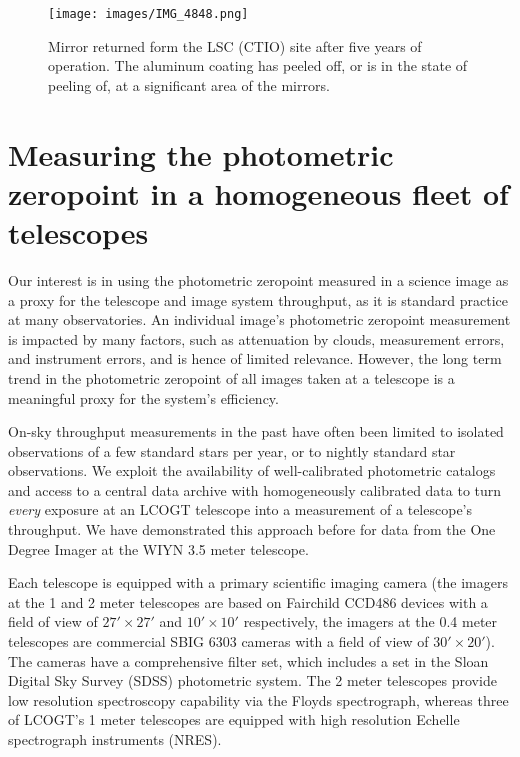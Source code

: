 \documentclass[]{spie}
\begin{document}
\begin{figure}
\texttt{[image: images/IMG\_4848.png]}
\caption{\label{fig_mirrorpeel} Mirror returned form the LSC (CTIO) site after five years of
operation. The aluminum coating has peeled off, or is in the state of peeling of, at a significant
area of the mirrors. }
\end{figure}


\section{Measuring the photometric zeropoint in a homogeneous fleet of telescopes}


Our interest is in using the photometric zeropoint measured in a science image as a proxy for the
telescope and image system throughput, as it is standard practice at many observatories. An
individual image's photometric zeropoint measurement is impacted by many factors, such as
attenuation by clouds, measurement errors, and instrument errors, and is hence of limited relevance.
However, the long term trend in the photometric zeropoint of all images taken at a telescope is a
meaningful proxy for the system's efficiency.

On-sky throughput measurements in the past have often been limited to isolated observations of a few
standard stars per year\cite{benn2000}, or to nightly standard star observations\cite{hopp2008}. We
exploit the availability of well-calibrated photometric catalogs and access to a central
data archive with homogeneously calibrated data to turn {\em every} exposure at an LCOGT telescope
into a measurement of a telescope's throughput. We have demonstrated this approach before for data
from the One Degree Imager at the WIYN 3.5 meter telescope\cite{harbeck2014}.

Each telescope is equipped with a primary scientific imaging camera (the imagers at the 1 and 2
meter telescopes are based on Fairchild CCD486 devices with a field of view of $27' \times 27'$ and
$10' \times 10'$ respectively, the imagers at the 0.4 meter telescopes are commercial SBIG 6303
cameras with a field of view of $30' \times 20'$). The cameras have a comprehensive filter set,
which includes a set in the Sloan Digital Sky Survey (SDSS) photometric system\cite{fukugita1996}.
The 2 meter telescopes provide low resolution spectroscopy capability via the
Floyds\cite{brown2013} spectrograph, whereas three of LCOGT's 1 meter telescopes are equipped with
high resolution Echelle spectrograph instruments (NRES)\cite{eastman2014,siverd2016}.
\end{document}
